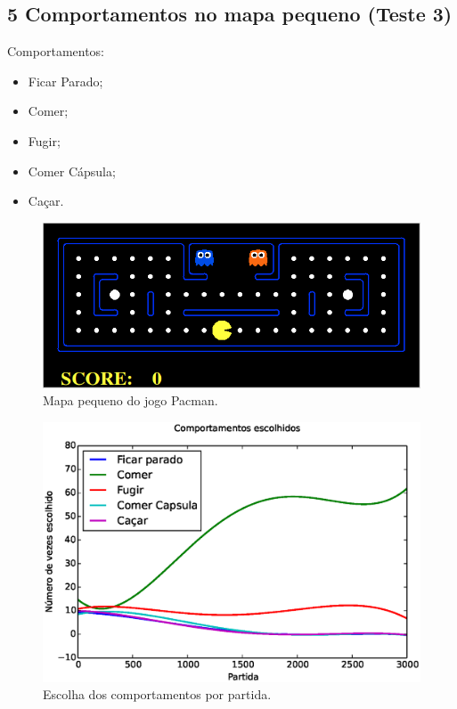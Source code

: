 \documentclass{beamer}
\begin{document}

\subsection{5 Comportamentos no mapa pequeno (Teste 3)}

\begin{frame}
Comportamentos:
\begin{itemize}
	\item Ficar Parado;
	\item Comer;
	\item Fugir;
	\item Comer Cápsula;
	\item Caçar.
\end{itemize}

\begin{figure}[h]
    \centering
    \includegraphics[width=0.6\linewidth]{images/pacman_small_map}
    \caption{Mapa pequeno do jogo Pacman.}
\end{figure}
\end{frame}


\begin{frame}
\begin{figure}[H]
    \centering
    \includegraphics[width=\linewidth]{images/5_behaviors_small_map/chosen_behaviors_pol}
    \caption{Escolha dos comportamentos por partida.}
    \label{img:5ComportamentosMapaPequeno:ComportamentosEscolhidosPolinomio}
\end{figure}
\end{frame}
\end{document}
